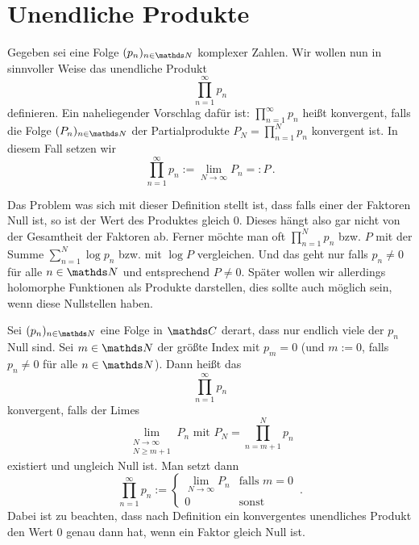\section{Unendliche Produkte}


Gegeben sei eine Folge $(p_n)_{n\in\NN}$ komplexer Zahlen.
Wir wollen nun in sinnvoller Weise das unendliche Produkt
\[
	\prod _ {n=1} ^\infty p_n
\]
definieren.
Ein naheliegender Vorschlag dafür ist:
$\prod _ {n=1} ^\infty p_n$ heißt konvergent, falls die Folge $(P_n)_{n\in\NN}$ der Partialprodukte $P_N = \prod _{n=1}^N p_n$ konvergent ist.
In diesem Fall setzen wir
\[
	\prod_{n=1} ^\infty p_n := \lim_{N\to\infty} P_n =: P\,.
\]

Das Problem was sich mit dieser Definition stellt ist, dass falls einer der Faktoren Null ist, so ist der Wert des Produktes gleich $0$.
Dieses hängt also gar nicht von der Gesamtheit der Faktoren ab.
Ferner möchte man oft $\prod _{n=1}^N p_n$ bzw. $P$ mit der Summe $\sum _{n=1}^N \log p_n$ bzw. mit $\log P$ vergleichen.
Und das geht nur falls $p_n\not=0$ für alle $n\in\NN$ und entsprechend $P\not=0$.
Später wollen wir allerdings holomorphe Funktionen als Produkte darstellen, dies sollte auch möglich sein, wenn diese Nullstellen haben.

\begin{defi}
Sei $(p_n)_{n\in\NN}$ eine Folge in $\CC$ derart, dass nur endlich viele der $p_n$ Null sind.
Sei $m\in \NN$ der größte Index mit $p_m = 0$ (und $m:=0$, falls $p_n \not= 0$ für alle $n\in\NN$).
Dann heißt das 
\[
	\prod_{n=1}^\infty p_n
\]
konvergent, falls der Limes
\[
	\lim_{\substack{N\to\infty\\ \scriptscriptstyle N \geq m+1}} P_n \text{ mit } P_N = \prod _ {n=m+1} ^N p_n
\]
existiert und ungleich Null ist.
Man setzt dann
\[
	\prod _ {n=1} ^\infty p_n :=
	\begin{cases}
		\lim\limits_{N\to\infty} P_n &\text{falls } m=0 \\
		0 &\text{sonst}
	\end{cases}
	\,.
\]
Dabei ist zu beachten, dass nach Definition ein konvergentes unendliches Produkt den Wert 0 genau dann hat, wenn ein Faktor gleich Null ist.
\end{defi}

